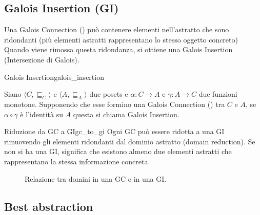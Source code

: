 \subsection{Galois Insertion (GI)}

Una Galois Connection () può contenere elementi
nell'astratto che sono ridondanti (più elementi astratti rappresentano lo
stesso oggetto concreto)
Quando viene rimossa questa ridondanza, si ottiene una Galois Insertion
(Intersezione di Galois).

\begin{definizione}{Galois Insertion}{galois_insertion}

    Siano $\langle C, \sqsubseteq_C \rangle$ e $\langle A, \sqsubseteq_A \rangle$
due posets e $\alpha: C \rightarrow A$ e $\gamma: A \rightarrow C$ due funzioni
monotone. Supponendo che esse formino una Galois Connection
() tra $C$ e $A$, se $\alpha \circ \gamma$ è
l'identità su $A$ questa si chiama Galois Insertion.

\end{definizione}

\begin{nota}{Riduzione da GC a GI}{gc_to_gi}
Ogni GC può essere ridotta a una GI rimuovendo gli elementi ridondanti
dal dominio astratto (domain reduction).
Se non si ha una GI, significa che esistono almeno due elementi astratti che
rappresentano la stessa informazione concreta.
\end{nota}

\begin{figure}[H]
    \centering
    \caption{Relazione tra domini in una GC e in una GI.}
    \label{fig:gc_vs_gi}
\end{figure}

\subsection{Best abstraction}

